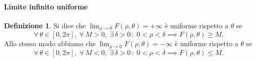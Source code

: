 \documentclass{article}
\theoremstyle{plain}
\theoremstyle{definition}
\newtheorem{defn}{Definizione}[section]
\theoremstyle{remark}
\begin{document}
\paragraph{Limite infinito uniforme}
\begin{bxthm}
\begin{defn}
    Si dice che $\lim_{\rho\to0}F(\rho,\theta)=+\infty$ è uniforme rispetto a $\theta$ se
    \[\forall\,\theta\in[0,2\pi],\;\forall\, M>0,\;\exists\,\delta>0\, :\; 0<\rho<\delta\implies F(\rho,\theta)\geq M.\]
    Allo stesso modo abbiamo che $\lim_{\rho\to0}F(\rho,\theta)=-\infty$ è uniforme rispetto a $\theta$ se
    \[\forall\,\theta\in[0,2\pi],\;\forall\, M<0,\;\exists\,\delta>0\, :\; 0<\rho<\delta\implies F(\rho,\theta)\leq M.\]
\end{defn}
\end{bxthm}

\vspace{10pt}
\end{document}
